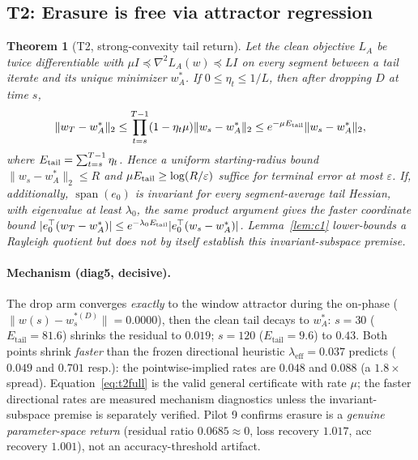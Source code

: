 \documentclass{article}
\newtheorem{theorem}{Theorem}
\newcommand{\lam}{\lambda}
\newcommand{\lameff}{\lam_{\mathrm{eff}}}
\begin{document}
\subsection{T2: Erasure is free via attractor regression}
\label{sec:t2}

\begin{theorem}[T2, strong-convexity tail return]
\label{thm:t2}
Let the clean objective $L_A$ be twice differentiable with
$\mu I\preceq\nabla^2L_A(w)\preceq LI$ on every segment between a tail iterate and its unique
minimizer $w_A^*$. If $0\leq\eta_t\leq1/L$, then after dropping $D$ at time $s$,
\begin{equation}
\|w_T-w_A^*\|_2\leq
\prod_{t=s}^{T-1}(1-\eta_t\mu)\|w_s-w_A^*\|_2
\leq e^{-\mu E_{\rm tail}}\|w_s-w_A^*\|_2,
\label{eq:t2full}
\end{equation}
where $E_{\rm tail}=\sum_{t=s}^{T-1}\eta_t$. Hence a uniform starting-radius bound
$\|w_s-w_A^*\|_2\leq R$ and
$\mu E_{\rm tail}\geq\log(R/\varepsilon)$ suffice for terminal error at most $\varepsilon$.
If, additionally, $\operatorname{span}(e_0)$ is invariant for every segment-average tail
Hessian, with eigenvalue at least $\lambda_0$, the same product argument gives the faster
coordinate bound
$|e_0^\top(w_T-w_A^*)|\leq e^{-\lambda_0E_{\rm tail}}
|e_0^\top(w_s-w_A^*)|$. Lemma~\ref{lem:c1} lower-bounds a Rayleigh quotient but does not by
itself establish this invariant-subspace premise.
\end{theorem}

\paragraph{Mechanism (diag5, decisive).} The drop arm converges \emph{exactly} to the window
attractor during the on-phase ($\|w(s)-w^{*(D)}_s\|=0.0000$), then the clean tail decays to
$w^*_A$: $s=30$ ($E_{\mathrm{tail}}=81.6$) shrinks the
residual to $0.019$; $s=120$ ($E_{\mathrm{tail}}=9.6$) to $0.43$. Both points shrink
\emph{faster} than the frozen directional heuristic $\lameff=0.037$ predicts ($0.049$ and
$0.701$ resp.):
the pointwise-implied rates are $0.048$ and $0.088$ (a $1.8\times$ spread). Equation~\ref{eq:t2full}
is the valid general certificate with rate $\mu$; the faster directional rates are measured
mechanism diagnostics unless the invariant-subspace premise is separately verified. Pilot 9 confirms erasure
is a \emph{genuine parameter-space return} (residual ratio $0.0685\approx0$, loss recovery $1.017$,
acc recovery $1.001$), not an accuracy-threshold artifact.
\end{document}
